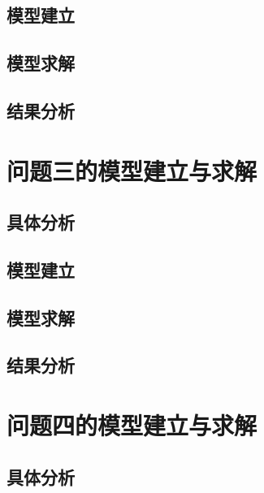 \documentclass[withoutpreface,bwprint]{cumcmthesis}
\begin{document}
\subsection{模型建立}

\subsection{模型求解}

\subsection{结果分析}

\newpage
\section{问题三的模型建立与求解}

\subsection{具体分析}

\subsection{模型建立}

\subsection{模型求解}

\subsection{结果分析}

\newpage
\section{问题四的模型建立与求解}

\subsection{具体分析}
\end{document}
